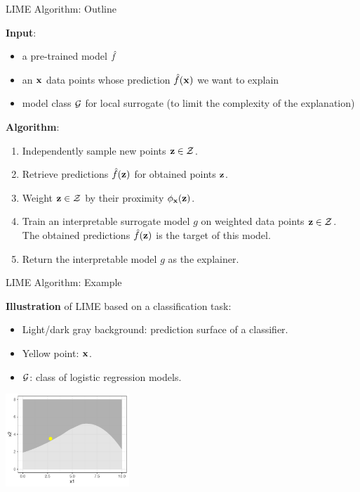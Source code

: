 \documentclass[11pt,compress,t,notes=noshow, aspectratio=169, xcolor=table]{beamer}
\begin{document}
\begin{frame}[c]{LIME Algorithm: Outline}
		
		\textbf{Input}:
		\begin{itemize}
		    \item a pre-trained model $\fh$
		    \item an $\xv$ data points whose prediction $\fh(\xv)$ we want to explain
		    \item model class $\Gspace$ for local surrogate (to limit the complexity of the explanation)
		\end{itemize}
		
		\pause
		\medskip
		
		\textbf{Algorithm}:
		\begin{enumerate}
    		\item Independently sample new points $\zv \in \Zspace$. 
    		\item Retrieve predictions $\fh(\zv)$ for obtained points $\zv$. 
    		\item Weight $\zv \in \Zspace$ by their proximity $\neigh(\zv)$.
    		\item Train an interpretable surrogate model $g$ on weighted data points $\zv \in \Zspace$.\\ The obtained predictions $\fh(\zv)$ is the target of this model.
    		\item Return the interpretable model $g$ as the explainer.
		\end{enumerate}
		

	
\end{frame} 

\begin{frame}[c]{LIME Algorithm: Example}

    	\textbf{Illustration} of LIME based on a classification task:
		\begin{itemize}
			\item Light/dark gray background: prediction surface of a classifier.
			\item Yellow point: $\xv$. 
			\item $\Gspace$: class of logistic regression models. 
		\end{itemize}
		\begin{center}
			\includegraphics[width=0.35\textwidth]{figure/lime2}
		\end{center}

\end{frame} 
\end{document}

